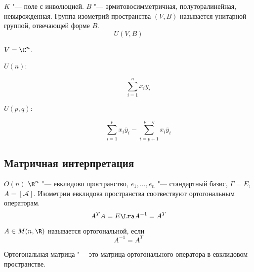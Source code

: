 \begin{Def}
	$K$ "--- поле с инволюцией.
	$B$ "--- эрмитовосимметричная, полуторалинейная, невырожденная.
	Группа изометрий пространства $(V, B)$ называется унитарной группой, отвечающей форме $B$.
	\[ U(V, B) \]
\end{Def}

\begin{exmp}
	$V = \C^n$.
	\begin{description}
	\item[$U(n)$:]
		\[ \sum_{i=1}^n x_i \bar y_i \]

	\item[$U(p, q)$:]
		\[ \sum_{i=1}^p x_i \bar y_i - \sum_{i=p+1}^{p+q} x_i \bar y_i \]
	\end{description}
\end{exmp}

\subsection{Матричная интерпретация}

$O(n)$ %
$\R^n$ "--- евклидово пространство, $e_1, \dots, e_n$ "--- стандартный базис, $\Gamma = E$, $A = [\mathcal A]$.
Изометрии евклидова пространства соотвествуют ортогональным операторам.
\[ A^T A = E \Lra A^{-1} = A^T \]

\begin{Def}
	$A \in M(n, \R)$ называется ортогональной, если
	\[ A^{-1} = A^T \]
\end{Def}

Ортогональная матрица "--- это матрица ортогонального оператора в евклидовом пространстве.

